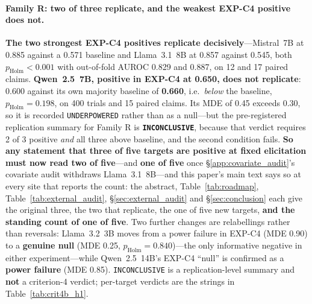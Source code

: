 \paragraph{Family R: two of three replicate, and the weakest EXP-C4 positive does not.} \textbf{The two strongest EXP-C4 positives replicate decisively}---Mistral~7B at 0.885 against a 0.571 baseline and Llama~3.1~8B at 0.857 against 0.545, both $p_{\mathrm{Holm}}\!<\!0.001$ with out-of-fold AUROC 0.829 and 0.887, on 12 and 17 paired claims. \textbf{Qwen~2.5~7B, positive in EXP-C4 at 0.650, does not replicate}: 0.600 against its own majority baseline of \textbf{0.660}, i.e.\ \emph{below} the baseline, $p_{\mathrm{Holm}}\!=\!0.198$, on 400 trials and 15 paired claims. Its MDE of 0.45 exceeds 0.30, so it is recorded \texttt{UNDERPOWERED} rather than as a null---but the pre-registered replication summary for Family R is \textbf{\texttt{INCONCLUSIVE}}, because that verdict requires 2 of 3 positive \emph{and} all three above baseline, and the second condition fails. \textbf{So any statement that three of five targets are positive at fixed elicitation must now read two of five}---and \textbf{one of five} once §\ref{app:covariate_audit}'s covariate audit withdraws Llama~3.1~8B---and this paper's main text says so at every site that reports the count: the abstract, Table~\ref{tab:roadmap}, Table~\ref{tab:external_audit}, §\ref{sec:external_audit} and §\ref{sec:conclusion} each give the original three, the two that replicate, the one of five new targets, \textbf{and the standing count of one of five}. Two further changes are relabellings rather than reversals: Llama~3.2~3B moves from a power failure in EXP-C4 (MDE 0.90) to a \textbf{genuine null} (MDE 0.25, $p_{\mathrm{Holm}}\!=\!0.840$)---the only informative negative in either experiment---while Qwen~2.5~14B's EXP-C4 ``null'' is confirmed as a \textbf{power failure} (MDE 0.85). \texttt{INCONCLUSIVE} is a replication-level summary and \textbf{not} a criterion-4 verdict; per-target verdicts are the strings in Table~\ref{tab:crit4b_h1}.

